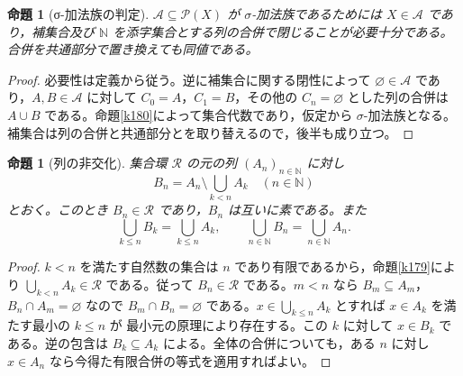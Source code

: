 \documentclass[a5paper,10pt,dvipdfmx]{jsarticle}
\theoremstyle{definition}
\theoremstyle{plain}
\newtheorem{prop}[ruledef]{命題}
\newcommand{\Pow}{\mathcal{P}}
\newcommand{\GenronRefText}[2]{#2}
\begin{document}
\begin{prop}[σ-加法族の判定]\label{k184}
$\mathcal A\subseteq\Pow(X)$ が $\sigma$-加法族であるためには $X\in\mathcal A$ であり，補集合及び $\mathbb N$ を添字集合とする列の合併で閉じることが必要十分である。合併を共通部分で置き換えても同値である。
\end{prop}
\begin{proof}
必要性は定義から従う。逆に補集合に関する閉性によって $\varnothing\in\mathcal A$ であり，$A,B\in\mathcal A$ に対して $C_0=A$，$C_1=B$，その他の $C_n=\varnothing$ とした列の合併は $A\cup B$ である。命題\ref{k180}によって集合代数であり，仮定から $\sigma$-加法族となる。補集合は列の合併と共通部分とを取り替えるので，後半も成り立つ。
\end{proof}
\begin{prop}[列の非交化]\label{k185}
集合環 $\mathcal R$ の元の列 $(A_n)_{n\in\mathbb N}$ に対し
\[B_n=A_n\setminus\bigcup_{k<n}A_k\quad(n\in\mathbb N)\]
とおく。このとき $B_n\in\mathcal R$ であり，$B_n$ は互いに素である。また
\[\bigcup_{k\leq n}B_k=\bigcup_{k\leq n}A_k,\qquad
\bigcup_{n\in\mathbb N}B_n=\bigcup_{n\in\mathbb N}A_n.\]
\end{prop}
\begin{proof}
$k<n$ を満たす自然数の集合は $n$ であり有限であるから，命題\ref{k179}により $\bigcup_{k<n}A_k\in\mathcal R$ である。従って $B_n\in\mathcal R$ である。$m<n$ なら $B_m\subseteq A_m$，$B_n\cap A_m=\varnothing$ なので $B_m\cap B_n=\varnothing$ である。$x\in\bigcup_{k\leq n}A_k$ とすれば $x\in A_k$ を満たす最小の $k\leq n$ が \GenronRefText{K-000104}{最小元の原理}により存在する。この $k$ に対して $x\in B_k$ である。逆の包含は $B_k\subseteq A_k$ による。全体の合併についても，ある $n$ に対し $x\in A_n$ なら今得た有限合併の等式を適用すればよい。
\end{proof}
\end{document}

